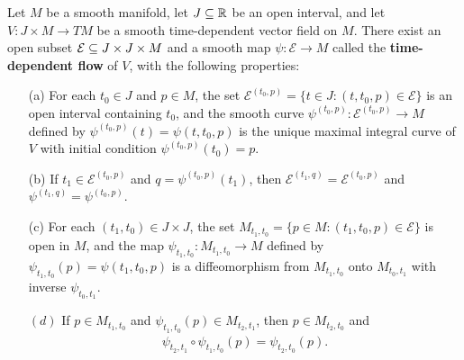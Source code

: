 \begin{theorem}\label{flow fundamental thm time-dependent}
Let $M$ be a smooth manifold, let $J\subseteq\mathbb{R}$ be an open interval, and let $V:J\times M\to TM$ be a smooth time-dependent vector field on $M$. There exist an open subset $\mathcal{E}\subseteq J\times J\times M$ and a smooth map $\psi:\mathcal{E}\to M$ called the \textbf{time-dependent flow} of $V$, with the following properties:
\begin{itemize}
\item[(a)] For each $t_0\in J$ and $p\in M$, the set $\mathcal{E}^{(t_0,p)}=\{t\in J:(t,t_0,p)\in\mathcal{E}\}$ is an open interval containing $t_0$, and the smooth curve $\psi^{(t_0,p)}:\mathcal{E}^{(t_0,p)}\to M$ defined by $\psi^{(t_0,p)}(t)=\psi(t,t_0,p)$ is the unique maximal integral curve of $V$ with initial condition $\psi^{(t_0,p)}(t_0)=p$.
\item[(b)] If $t_1\in\mathcal{E}^{(t_0,p)}$ and $q=\psi^{(t_0,p)}(t_1)$, then $\mathcal{E}^{(t_1,q)}=\mathcal{E}^{(t_0,p)}$ and $\psi^{(t_1,q)}=\psi^{(t_0,p)}$.
\item[(c)] For each $(t_1,t_0)\in J\times J$, the set $M_{t_1,t_0}=\{p\in M:(t_1,t_0,p)\in\mathcal{E}\}$ is open in $M$, and the map $\psi_{t_1,t_0}:M_{t_1,t_0}\to M$ defined by $\psi_{t_1,t_0}(p)=\psi(t_1,t_0,p)$ is a diffeomorphism from $M_{t_1,t_0}$ onto $M_{t_0,t_1}$ with inverse $\psi_{t_0,t_1}$.
\item[$(d)$] If $p\in M_{t_1,t_0}$ and $\psi_{t_1,t_0}(p)\in M_{t_2,t_1}$, then $p\in M_{t_2,t_0}$ and
\begin{align}\label{flow fundamental thm time-dependent-1}
\psi_{t_2,t_1}\circ\psi_{t_1,t_0}(p)=\psi_{t_2,t_0}(p).
\end{align}  
\end{itemize}
\end{theorem}
